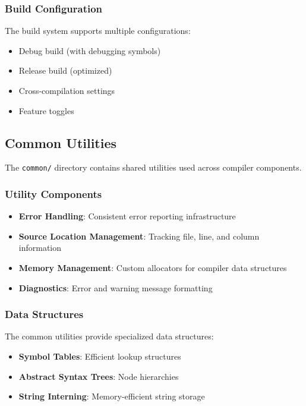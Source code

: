 \documentclass[12pt,a4paper]{article}
\begin{document}
\subsubsection{Build Configuration}

The build system supports multiple configurations:

\begin{itemize}
    \item Debug build (with debugging symbols)
    \item Release build (optimized)
    \item Cross-compilation settings
    \item Feature toggles
\end{itemize}

\subsection{Common Utilities}

The \texttt{common/} directory contains shared utilities used across compiler components.

\subsubsection{Utility Components}

\begin{itemize}
    \item \textbf{Error Handling}: Consistent error reporting infrastructure
    \item \textbf{Source Location Management}: Tracking file, line, and column information
    \item \textbf{Memory Management}: Custom allocators for compiler data structures
    \item \textbf{Diagnostics}: Error and warning message formatting
\end{itemize}

\subsubsection{Data Structures}

The common utilities provide specialized data structures:

\begin{itemize}
    \item \textbf{Symbol Tables}: Efficient lookup structures
    \item \textbf{Abstract Syntax Trees}: Node hierarchies
    \item \textbf{String Interning}: Memory-efficient string storage
\end{itemize}
\end{document}
